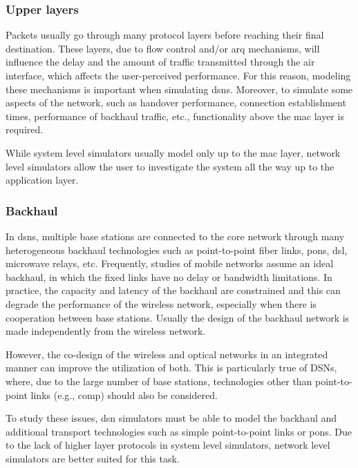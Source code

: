 \documentclass[conference]{IEEEtran}
\begin{document}
\subsubsection{Upper layers}\label{subsect:Upper_layers}

Packets usually go through many protocol layers before reaching their final destination. These layers, due to flow control and/or \ac{arq} mechanisms, will influence the delay and the amount of traffic transmitted through the air interface, which affects the user-perceived performance. For this reason, modeling these mechanisms is important when simulating \acp{dsn}. Moreover, to simulate some aspects of the network, such as handover performance, connection establishment times, performance of backhaul traffic, etc., functionality above the \ac{mac} layer is required.

While system level simulators usually model only up to the \ac{mac} layer, network level simulators allow the user to investigate the system all the way up to the application layer.

\subsubsection{Backhaul}\label{subsect:Backhaul}

In \aclp{dsn}, multiple base stations are connected to the core network through many heterogeneous backhaul technologies such as point-to-point fiber links, \acp{pon}, \ac{dsl}, microwave relays, etc.
Frequently, studies of mobile networks assume an ideal backhaul, in which the fixed links have no delay or bandwidth limitations.
In practice, the capacity and latency of the backhaul are constrained and this can degrade the performance of the wireless network, especially when there is cooperation between base stations.
Usually the design of the backhaul network is made independently from the wireless network.

However, the co-design of the wireless and optical networks in an integrated manner can improve the utilization of both. This is particularly true of DSNs, where, due to the large number of base stations, technologies other than point-to-point links (e.g., \ac{comp}) should also be considered.

To study these issues, \ac{dsn} simulators must be able to model the backhaul and additional transport technologies such as simple point-to-point links or \acp{pon}. Due to the lack of higher layer protocols in system level simulators, network level simulators are better suited for this task.
\end{document}
